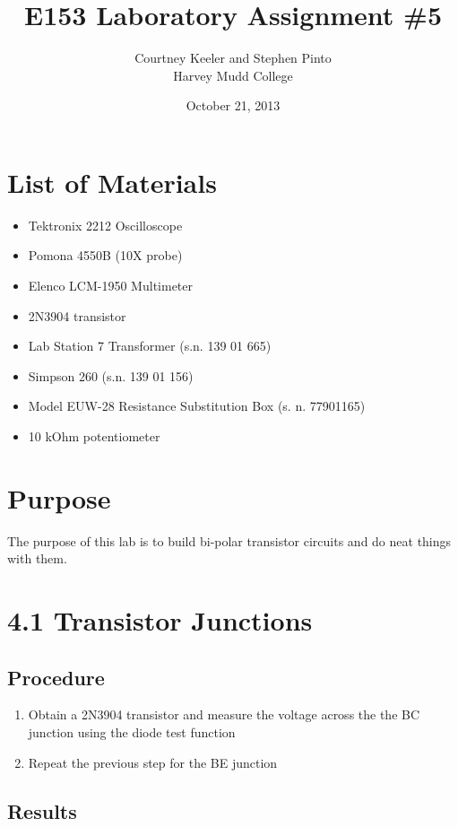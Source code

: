 \documentclass[12pt,letterpaper]{report}
\begin{document}
\title{E153 Laboratory Assignment \#5}
\author{Courtney Keeler and Stephen Pinto\\
Harvey Mudd College}
\date{October 21, 2013}
\maketitle

\section*{List of Materials}
\begin{itemize}
	\item Tektronix 2212 Oscilloscope
	\item Pomona 4550B (10X probe)
	\item Elenco LCM-1950 Multimeter
	\item 2N3904 transistor
	\item Lab Station 7 Transformer (s.n. 139 01 665)
	\item Simpson 260 (s.n. 139 01 156)
	\item Model EUW-28 Resistance Substitution Box (s. n. 77901165)
	\item 10 kOhm potentiometer
\end{itemize}

\section*{Purpose}
The purpose of this lab is to build bi-polar transistor circuits and do neat things with them.

\section*{4.1 Transistor Junctions}
\subsection*{Procedure}

\begin{enumerate}
\item Obtain a 2N3904 transistor and measure the voltage across the the BC junction using the diode test function
\item Repeat the previous step for the BE junction
\end{enumerate}

\subsection*{Results}
\end{document}
